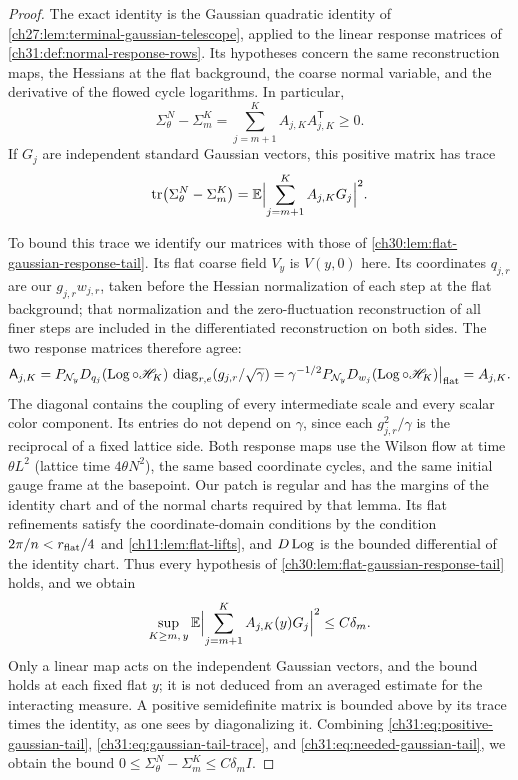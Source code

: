 \begin{proof}
The exact identity is the Gaussian quadratic identity of \cref{ch27:lem:terminal-gaussian-telescope}, applied to the linear response matrices of \cref{ch31:def:normal-response-rows}. Its hypotheses concern the same reconstruction maps, the Hessians at the flat background, the coarse normal variable, and the derivative of the flowed cycle logarithms. In particular,
\begin{equation}\label{ch31:eq:positive-gaussian-tail}
 \Sigma_\theta^N-\Sigma_m^K=\sum_{j=m+1}^KA_{j,K}A_{j,K}^{\mathsf T}\ge0.
\end{equation}
If $G_j$ are independent standard Gaussian vectors, this positive matrix has trace
\begin{equation}\label{ch31:eq:gaussian-tail-trace}
 \operatorname{tr}\bigl(\Sigma_\theta^N-\Sigma_m^K\bigr)=\mathbb E\Bigl\lvert\sum_{j=m+1}^KA_{j,K}G_j\Bigr\rvert^2.
\end{equation}

To bound this trace we identify our matrices with those of \cref{ch30:lem:flat-gaussian-response-tail}. Its flat coarse field $V_y$ is $V(y,0)$ here. Its coordinates $q_{j,r}$ are our $g_{j,r}w_{j,r}$, taken before the Hessian normalization of each step at the flat background; that normalization and the zero-fluctuation reconstruction of all finer steps are included in the differentiated reconstruction on both sides. The two response matrices therefore agree:
\[
 \mathsf A_{j,K}=P_{\mathcal N_{y}}D_{q_j}(\operatorname{Log}\circ\mathscr H_K)\,\operatorname{diag}_{r,e}(g_{j,r}/\sqrt\gamma)
 =\gamma^{-1/2}P_{\mathcal N_{y}}D_{w_j}(\operatorname{Log}\circ\mathscr H_K)\big|_{\rm flat}=A_{j,K}.
\]
The diagonal contains the coupling of every intermediate scale and every scalar color component. Its entries do not depend on $\gamma$, since each $g_{j,r}^2/\gamma$ is the reciprocal of a fixed lattice side. Both response maps use the Wilson flow at time $\theta L^2$ (lattice time $4\theta N^2$), the same based coordinate cycles, and the same initial gauge frame at the basepoint. Our patch is regular and has the margins of the identity chart and of the normal charts required by that lemma. Its flat refinements satisfy the coordinate-domain conditions by the condition $2\pi/n<r_{\rm flat}/4$ and \cref{ch11:lem:flat-lifts}, and $D\operatorname{Log}$ is the bounded differential of the identity chart. Thus every hypothesis of \cref{ch30:lem:flat-gaussian-response-tail} holds, and we obtain
\begin{equation}\label{ch31:eq:needed-gaussian-tail}
 \sup_{K\ge m,\,y}\mathbb E\Bigl\lvert\sum_{j=m+1}^KA_{j,K}(y)G_j\Bigr\rvert^2\le C\delta_m.
\end{equation}
Only a linear map acts on the independent Gaussian vectors, and the bound holds at each fixed flat $y$; it is not deduced from an averaged estimate for the interacting measure. A positive semidefinite matrix is bounded above by its trace times the identity, as one sees by diagonalizing it. Combining \eqref{ch31:eq:positive-gaussian-tail}, \eqref{ch31:eq:gaussian-tail-trace}, and \eqref{ch31:eq:needed-gaussian-tail}, we obtain the bound $0\le\Sigma_\theta^N-\Sigma_m^K\le C\delta_mI$.


\end{proof}
